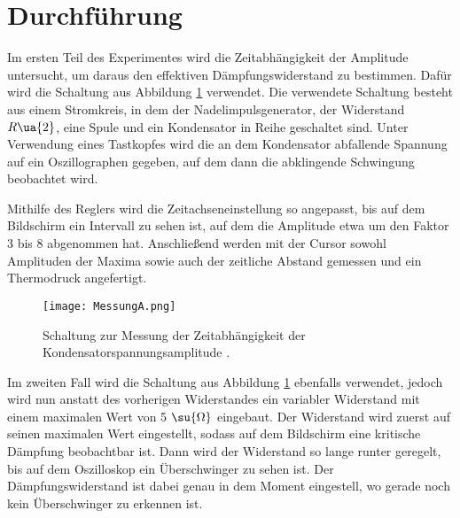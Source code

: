 \newpage

\section{Durchführung}

Im ersten Teil des Experimentes wird die Zeitabhängigkeit der Amplitude untersucht,
um daraus den effektiven Dämpfungswiderstand zu bestimmen. Dafür wird die Schaltung
aus Abbildung \ref{fig:MessungA} verwendet. Die verwendete Schaltung besteht aus
einem Stromkreis, in dem der Nadelimpulsgenerator, der Widerstand $R\ua{2}$, eine
Spule und ein Kondensator in Reihe geschaltet sind. Unter Verwendung eines Tastkopfes wird die an
dem Kondensator abfallende Spannung auf ein Oszillographen gegeben, auf dem dann
die abklingende Schwingung beobachtet wird.

Mithilfe des Reglers wird die Zeitachseneinstellung so angepasst, bis
auf dem Bildschirm ein Intervall zu sehen ist, auf dem die Amplitude etwa um
den Faktor 3 bis 8 abgenommen hat. Anschließend werden mit der Cursor sowohl
Amplituden der Maxima sowie auch der zeitliche Abstand gemessen und ein Thermodruck
angefertigt.

\FloatBarrier
\begin{figure}
  \centering
  \texttt{[image: MessungA.png]}
  \caption{Schaltung zur Messung der Zeitabhängigkeit der Kondensatorspannungsamplitude \cite{anleitung01}.}
  \label{fig:MessungA}
\end{figure}
\FloatBarrier

Im zweiten Fall wird die Schaltung aus Abbildung \ref{fig:MessungA} ebenfalls
verwendet, jedoch wird nun anstatt des vorherigen Widerstandes ein variabler
Widerstand mit einem maximalen Wert von 5 $\su{\Omega}$ eingebaut. Der Widerstand wird
zuerst auf seinen maximalen Wert eingestellt, sodass auf dem Bildschirm eine
kritische Dämpfung beobachtbar ist. Dann wird der Widerstand so lange runter geregelt, bis
auf dem Oszilloskop ein Überschwinger zu sehen ist. Der Dämpfungswiderstand ist
dabei genau in dem Moment eingestell, wo gerade noch kein Überschwinger zu erkennen
ist.


